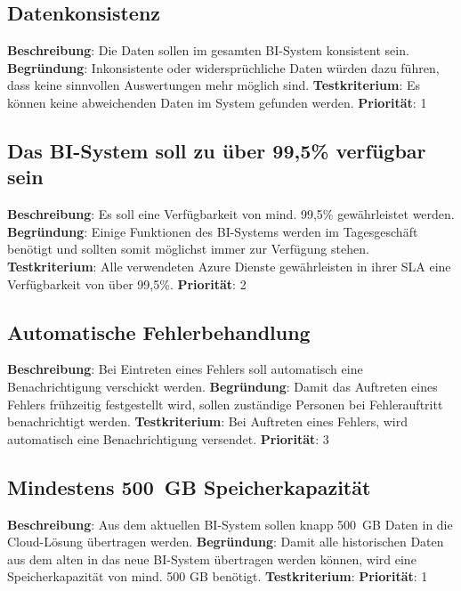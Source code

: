 \subsection{Datenkonsistenz} \label{sec:anforderungsspezifikation:Datenkonsistenz}
\textbf{Beschreibung}: Die Daten sollen im gesamten BI-System konsistent sein.
\newline \textbf{Begründung}: Inkonsistente oder widersprüchliche Daten würden dazu führen, dass keine sinnvollen Auswertungen mehr möglich sind.
\newline \textbf{Testkriterium}: Es können keine abweichenden Daten im System gefunden werden.
\newline \textbf{Priorität}: 1

\subsection{Das BI-System soll zu über 99,5\% verfügbar sein} \label{sec:anforderungsspezifikation:}
\textbf{Beschreibung}:  Es soll eine Verfügbarkeit von mind. 99,5\% gewährleistet werden. 
\newline \textbf{Begründung}: Einige Funktionen des BI-Systems werden im Tagesgeschäft benötigt und sollten somit möglichst immer zur Verfügung stehen.
\newline \textbf{Testkriterium}: Alle verwendeten Azure Dienste gewährleisten in ihrer SLA eine Verfügbarkeit von über 99,5\%.
\newline \textbf{Priorität}: 2

\subsection{Automatische Fehlerbehandlung} \label{sec:anforderungsspezifikation:AutomatischeFehlerbehandlung}
\textbf{Beschreibung}: Bei Eintreten eines Fehlers soll automatisch eine Benachrichtigung verschickt werden. 
\newline \textbf{Begründung}: Damit das Auftreten eines Fehlers frühzeitig festgestellt wird, sollen zuständige Personen bei Fehlerauftritt benachrichtigt werden.
\newline \textbf{Testkriterium}: Bei Auftreten eines Fehlers, wird automatisch eine Benachrichtigung versendet.
\newline \textbf{Priorität}: 3

\subsection{Mindestens 500 GB Speicherkapazität} \label{sec:anforderungsspezifikation:speicherkapazität}
\textbf{Beschreibung}: Aus dem aktuellen BI-System sollen knapp 500 GB Daten in die Cloud-Lösung übertragen werden.
\newline \textbf{Begründung}: Damit alle historischen Daten aus dem alten in das neue BI-System übertragen werden können, wird eine Speicherkapazität von mind. 500 GB benötigt.
\newline \textbf{Testkriterium}: 
\newline \textbf{Priorität}: 1


